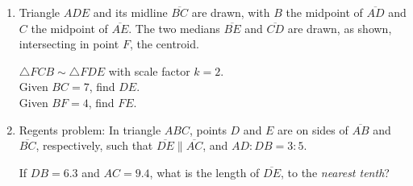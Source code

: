 \begin{enumerate}
\newpage
\item Triangle $ADE$ and its midline $\overline{BC}$ are drawn, with $B$ the midpoint of $\overline{AD}$ and $C$ the midpoint of $\overline{AE}$. The two medians $\overline{BE}$ and $\overline{CD}$ are drawn, as shown, intersecting in point $F$, the centroid.
\begin{multicols}{2}
  $\triangle FCB \sim \triangle FDE$ with scale factor $k=2$.\\[0.25cm]
  Given $BC=7$, find $DE$. \\[0.25cm] Given $BF=4$, find $FE$. \vspace{1cm}
  \begin{center}
    \end{center}
\end{multicols} \vspace{2cm}

\item Regents problem: In triangle $ABC$, points $D$ and $E$ are on sides of $\overline{AB}$ and $\overline{BC}$, respectively, such that $\overline{DE} \parallel \overline{AC}$, and $AD:DB = 3:5$.
\begin{center}
\end{center}
If $DB=6.3$ and $AC=9.4$, what is the length of $\overline{DE}$, to the \emph{nearest tenth}?


\end{enumerate}
